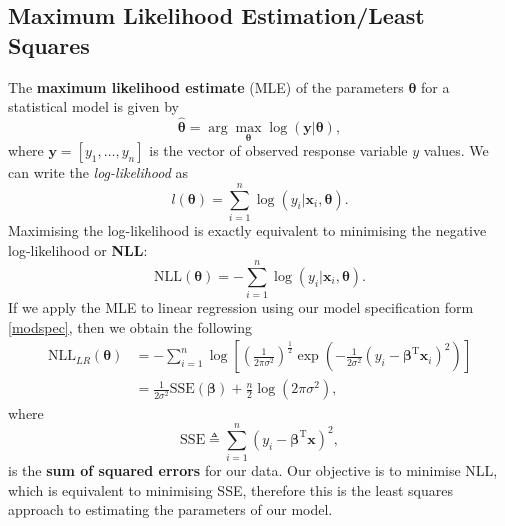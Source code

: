 \documentclass[10pt,a4paper]{article}
\numberwithin{equation}{section}
\theoremstyle{plain}
\theoremstyle{definition}
\theoremstyle{own}
\begin{document}
\subsection{Maximum Likelihood Estimation/Least Squares}
The \textbf{maximum likelihood estimate} (MLE) of the parameters $\boldsymbol\theta$ for a statistical model is given by
\begin{equation}
\hat{\boldsymbol\theta} = \arg \max_{\boldsymbol\theta} \log(\mathbf{y} | \boldsymbol\theta),
\end{equation}
where $\mathbf{y} = \left[ y_1, \ldots, y_n \right]$ is the vector of observed response variable $y$ values. We can write the \textit{log-likelihood} as
\begin{equation}
\mathit{l}(\boldsymbol\theta) = \sum_{i=1}^n \log(y_i | \mathbf{x}_i, \boldsymbol\theta).
\end{equation}
Maximising the log-likelihood is exactly equivalent to minimising the negative log-likelihood or \textbf{NLL}:
\begin{equation}
\mathrm{NLL}(\boldsymbol\theta) = -\sum_{i=1}^n \log(y_i | \mathbf{x}_i, \boldsymbol\theta).
\end{equation}
If we apply the MLE to linear regression using our model specification form \cref{modspec}, then we obtain the following
\begin{align}
\mathrm{NLL}_{LR}(\boldsymbol\theta) & = -\sum_{i=1}^n \log \left[ \left( \frac{1}{2 \pi \sigma^2} \right)^{\frac{1}{2}} \exp \left( - \frac{1}{2\sigma^2} (y_i - \boldsymbol\beta^{\text{T}} \mathbf{x}_i)^2 \right) \right]  \\
& = \frac{1}{2\sigma^2}\mathrm{SSE}(\boldsymbol\beta) + \frac{n}{2} \log(2 \pi \sigma^2),
\end{align}
where \[\mathrm{SSE} \triangleq \sum_{i=1}^n (y_i - \boldsymbol\beta^{\text{T}} \mathbf{x})^2,\]
is the \textbf{sum of squared errors} for our data. Our objective is to minimise NLL, which is equivalent to minimising SSE, therefore this is the least squares approach to estimating the parameters of our model.
\end{document}
